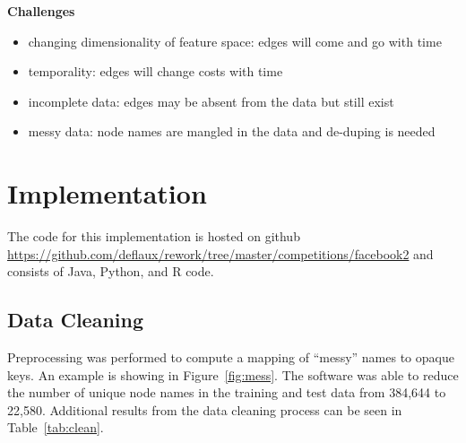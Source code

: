 \documentclass{article} %
\begin{document}
\textbf{Challenges}
\begin{itemize}
\item changing dimensionality of feature space: edges will come and go with time
\item temporality: edges will change costs with time
\item incomplete data: edges may be absent from the data but still exist
\item messy data: node names are mangled in the data and de-duping is needed
\end{itemize}

\section{Implementation}

The code for this implementation is hosted on github
\url{https://github.com/deflaux/rework/tree/master/competitions/facebook2}
and consists of Java, Python, and R code.


\subsection{Data Cleaning}

Preprocessing was performed to compute a mapping of ``messy'' names to
opaque keys.  An example is showing in Figure~\ref{fig:mess}.  The software was able to reduce the number of unique node
names in the training and test data from 384,644 to 22,580.  Additional
results from the data cleaning process can be seen in Table~\ref{tab:clean}.
\end{document}
